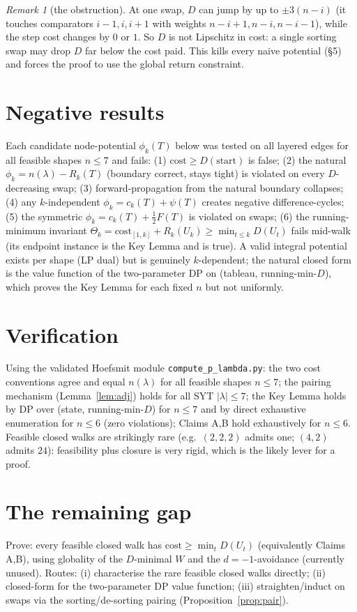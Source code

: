 \documentclass[11pt]{article}
\theoremstyle{plain}
\theoremstyle{remark}
\newtheorem{remark}[theorem]{Remark}
\newcommand{\cost}{\mathrm{cost}}
\begin{document}
\begin{remark}[the obstruction]
At one swap, $D$ can jump by up to $\pm 3(n-i)$ (it touches comparators $i{-}1,i,i{+}1$ with
weights $n-i{+}1,n-i,n-i{-}1$), while the step cost changes by $0$ or $1$. So $D$ is not
Lipschitz in cost: a single sorting swap may drop $D$ far below the cost paid. This kills
every naive potential (\S5) and forces the proof to use the global return constraint.
\end{remark}

\section{Negative results}
Each candidate node-potential $\phi_k(T)$ below was tested on all layered edges for all
feasible shapes $n\le7$ and fails: (1) $\cost\ge D(\text{start})$ is false; (2) the natural
$\phi_k=n(\lambda)-R_k(T)$ (boundary correct, stays tight) is violated on every $D$-decreasing
swap; (3) forward-propagation from the natural boundary collapses; (4) any $k$-independent
$\phi_k=c_k(T)+\psi(T)$ creates negative difference-cycles; (5) the symmetric
$\phi_k=c_k(T)+\tfrac12 F(T)$ is violated on swaps; (6) the running-minimum invariant
$\Theta_k=\cost_{[1,k]}+R_k(U_k)\ge\min_{t\le k}D(U_t)$ fails mid-walk (its endpoint
instance is the Key Lemma and is true). A valid integral potential exists per shape (LP
dual) but is genuinely $k$-dependent; the natural closed form is the value function of the
two-parameter DP on (tableau, running-min-$D$), which proves the Key Lemma for each fixed
$n$ but not uniformly.

\section{Verification}
Using the validated Hoefsmit module \texttt{compute\_p\_lambda.py}:
the two cost conventions agree and equal $n(\lambda)$ for all feasible shapes $n\le7$;
the pairing mechanism (Lemma~\ref{lem:adj}) holds for all SYT $|\lambda|\le7$; the Key Lemma
holds by DP over (state, running-min-$D$) for $n\le7$ and by direct exhaustive enumeration
for $n\le6$ (zero violations); Claims A,B hold exhaustively for $n\le6$. Feasible closed
walks are strikingly rare (e.g.\ $(2,2,2)$ admits one; $(4,2)$ admits $24$): feasibility
plus closure is very rigid, which is the likely lever for a proof.

\section*{The remaining gap}
Prove: every feasible closed walk has $\cost\ge\min_t D(U_t)$ (equivalently Claims A,B),
using globality of the $D$-minimal $W$ and the $d=-1$-avoidance (currently unused). Routes:
(i) characterise the rare feasible closed walks directly; (ii) closed-form for the
two-parameter DP value function; (iii) straighten/induct on swaps via the sorting/de-sorting
pairing (Proposition~\ref{prop:pair}).
\end{document}
